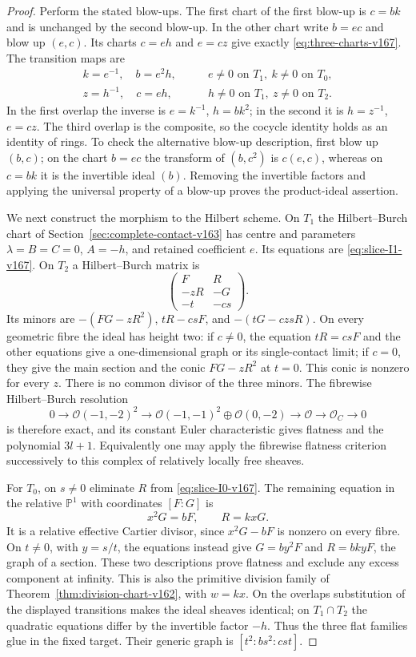\documentclass[11pt,reqno]{amsart}
\numberwithin{equation}{section}
\theoremstyle{definition}\newtheorem{definition}[theorem]{Definition}
\theoremstyle{remark}\newtheorem{remark}[theorem]{Remark}
\newcommand{\Pj}{\mathbb P}\newcommand{\A}{\mathbb A}
\newcommand{\OO}{\mathcal O}\newcommand{\II}{\mathcal I}
\begin{document}
\begin{proof}
Perform the stated blow-ups. The first chart of the first blow-up
is $c=bk$ and is unchanged by the second blow-up. In the other
chart write $b=ec$ and blow up $(e,c)$. Its charts $c=eh$ and
$e=cz$ give exactly \eqref{eq:three-charts-v167}. The transition
maps are
\begin{align*}
 k=e^{-1},\quad b=e^2h,
 &\qquad e\ne0 \text{ on }T_1,\ k\ne0\text{ on }T_0,\\
 z=h^{-1},\quad c=eh,
 &\qquad h\ne0 \text{ on }T_1,\ z\ne0\text{ on }T_2.
\end{align*}
In the first overlap the inverse is $e=k^{-1}$, $h=bk^2$;
in the second it is $h=z^{-1}$, $e=cz$. The third overlap is
the composite, so the cocycle identity holds as an identity of
rings. To check the alternative blow-up description, first blow
up $(b,c)$; on the chart $b=ec$ the transform of $(b,c^2)$ is
$c(e,c)$, whereas on $c=bk$ it is the invertible ideal $(b)$.
Removing the invertible factors and applying the universal
property of a blow-up proves the product-ideal assertion.

We next construct the morphism to the Hilbert scheme. On $T_1$
the Hilbert--Burch chart of
Section~\ref{sec:complete-contact-v163} has centre and parameters
$\lambda=B=C=0$, $A=-h$, and retained coefficient $e$.
Its equations are \eqref{eq:slice-I1-v167}. On $T_2$ a
Hilbert--Burch matrix is
\[
 \begin{pmatrix} F&R\\-zR&-G\\-t&-cs\end{pmatrix}.
\]
Its minors are $-(FG-zR^2)$, $tR-csF$, and
$-(tG-czsR)$. On every geometric fibre the ideal has height two:
if $c\ne0$, the equation $tR=csF$ and the other equations give a
one-dimensional graph or its single-contact limit; if $c=0$,
they give the main section and the conic $FG-zR^2$ at $t=0$.
This conic is nonzero for every $z$. There is no common divisor
of the three minors. The fibrewise Hilbert--Burch resolution
\[
 0\longrightarrow\OO(-1,-2)^2\longrightarrow
 \OO(-1,-1)^2\oplus\OO(0,-2)\longrightarrow\OO
 \longrightarrow\OO_C\longrightarrow0
\]
is therefore exact, and its constant Euler characteristic gives
flatness and the polynomial $3l+1$. Equivalently one may apply
the fibrewise flatness criterion successively to this complex of
relatively locally free sheaves.

For $T_0$, on $s\ne0$ eliminate $R$ from
\eqref{eq:slice-I0-v167}. The remaining equation in the relative
$\Pj^1$ with coordinates $[F:G]$ is
\[
                     x^2G=bF,\qquad R=kxG.
\]
It is a relative effective Cartier divisor, since $x^2G-bF$ is
nonzero on every fibre. On $t\ne0$, with $y=s/t$, the equations
instead give $G=by^2F$ and $R=bkyF$, the graph of a section.
These two descriptions prove flatness and exclude any excess
component at infinity. This is also the primitive division family
of Theorem~\ref{thm:division-chart-v162}, with $w=kx$.
On the overlaps substitution of the displayed transitions makes
the ideal sheaves identical; on $T_1\cap T_2$ the quadratic
equations differ by the invertible factor $-h$. Thus the three
flat families glue in the fixed target. Their generic graph is
$[t^2:bs^2:cst]$.


\end{proof}
\end{document}
